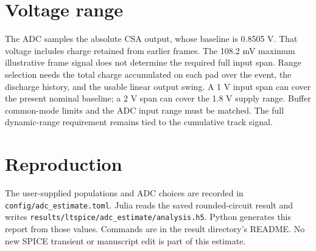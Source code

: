 \documentclass[11pt,a4paper]{article}
\begin{document}
\section*{Voltage range}
The ADC samples the absolute CSA output, whose baseline is 0.8505 V.
That voltage includes charge retained from earlier frames. The 108.2 mV
maximum illustrative frame signal does not determine the required full
input span. Range selection needs the total charge accumulated on each pad
over the event, the discharge history, and the usable linear output swing.
A 1 V input span can cover the present nominal baseline; a 2 V span can
cover the 1.8 V supply range. Buffer common-mode limits and the ADC input
range must be matched. The full dynamic-range requirement remains tied to
the cumulative track signal.

\section*{Reproduction}
The user-supplied populations and ADC choices are recorded in
\texttt{config/adc\_estimate.toml}. Julia reads the saved rounded-circuit
result and writes \texttt{results/ltspice/adc\_estimate/analysis.h5}.
Python generates this report from those values. Commands are in the
result directory's README. No new SPICE transient or manuscript edit is
part of this estimate.
\end{document}
